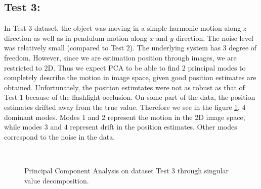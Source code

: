 \documentclass{article}
\begin{document}
\subsection{Test 3:}
In Test $3$ dataset, the object was moving in a simple harmonic motion along $z$ direction as well as in pendulum motion along $x$ and $y$ direction.  The noise level was relatively small (compared to Test $2$). The underlying system has $3$ degree of freedom. However, since we are estimation position through images, we are restricted to $2$D. Thus we expect PCA to be able to find $2$ principal modes to completely describe the motion in image space, given good position estimates are obtained. Unfortunately, the position estimtates were not as robust as that of Test $1$ because of the flashlight occlusion. On some part of the data, the position estimates drifted away from the true value. Therefore we see in the figure \ref{fig:test3}, $4$ dominant modes. Modes $1$ and $2$ represent the motion in the 2D image space, while modes $3$ and $4$ represent drift in the position estimates. Other modes correspond to the noise in the data.

\begin{figure}[!b]
\\
\caption{Principal Component Analysis on dataset Test 3 through singular value decomposition.}
\label{fig:test3}
\end{figure}
\end{document}
